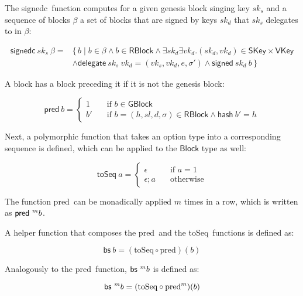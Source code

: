 \documentclass[11pt,a4paper]{article}
\newcommand\Set[2]{\{\,#1\mid#2\,\}}
\newcommand{\fun}[1]{\mathsf{#1}}
\newcommand{\type}[1]{\mathsf{#1}}
\newcommand{\GBlock}{\type{GBlock}}
\newcommand{\RBlock}{\type{RBlock}}
\newcommand{\Block}{\type{Block}}
\newcommand{\SKey}{\type{SKey}}
\newcommand{\VKey}{\type{VKey}}
\newcommand{\hashname}{hash}
\newcommand{\signedname}{signed}
\newcommand{\signedseqname}{signedc}
\newcommand{\delegatename}{delegate}
\newcommand{\predbname}{pred} %
\newcommand{\toseqname}{toSeq} %
\newcommand{\predbseqname}{bs} %
\newcommand{\signed}[2]{\fun{\signedname}\ #1 ~ #2}
\newcommand{\signedwindow}[2]{\fun{\signedseqname}\ #1 ~ #2}
\newcommand{\hash}[1]{\fun{\hashname}\ #1}
\newcommand{\delegate}[2]{\fun{\delegatename}\ #1 ~ #2}
\newcommand{\predb}[1]{\fun{\predbname} ~ #1}
\newcommand{\toseq}[1]{\fun{\toseqname} ~ #1}
\newcommand{\predbseq}[1]{\fun{\predbseqname} ~ #1}
\begin{document}
The \signedseqname\ function computes for a given genesis block singing key $sk_s$ and a sequence of blocks $\beta$ a set of blocks that are signed by keys $sk_d$ that $sk_s$ delegates to in $\beta$:

\begin{align}
  \label{eq:signed-window}
  \signedwindow{sk_s}{\beta} = & \Set{b}{b \in \beta \wedge b \in \RBlock \wedge \exists sk_d \exists vk_d. (sk_d, vk_d) \in \SKey \times \VKey \\
  & \wedge \delegate{sk_s}{vk_d} = (vk_s, vk_d, e, \sigma') \wedge \signed{sk_d}{b}}
\end{align}


A block has a block preceding it if it is not the genesis block:

\begin{equation}
  \label{eq:predb}
  \predb{b} =
  \begin{cases}
    1 & \quad \text{if } b \in \GBlock \\
    b' & \quad \text{if } b = (h, sl, d, \sigma) \in \RBlock \wedge \hash{b'} = h
  \end{cases}
\end{equation}

Next, a polymorphic function that takes an option type into a corresponding
sequence is defined, which can be applied to the $\Block$ type as well:

\begin{equation}
  \label{eq:toseq}
  \toseq{a} =
  \begin{cases}
    \epsilon & \quad \text{if } a = 1 \\
    \epsilon; a & \quad \text{otherwise}
  \end{cases}
\end{equation}

The function \predbname\ can be monadically applied $m$ times in a row, which
is written as $\predb^m{b}$.

A helper function that composes the \predbname\ and the \toseqname\
functions is defined as:

\begin{equation}
  \label{eq:predbseq}
  \predbseq{b} = (\text{\toseqname} \circ \text{\predbname})(b)
\end{equation}

Analogously to the \predbname\ function, $\predbseq^m{b}$ is defined as:

\begin{equation}
  \label{eq:predbseqton}
  \predbseq^m{b} = (\text{\toseqname} \circ \text{\predbname}^m)(b)
\end{equation}
\end{document}
